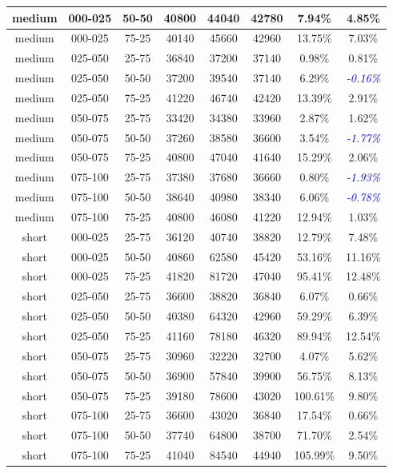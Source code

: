 \begin{table}
\begin{center}
\begin{tabular}{|c|c|c|c|c|c|c|c|}
\\\hline
medium & 000-025 & 50-50 & 40800 & 44040 & 42780 & 7.94\% & 4.85\%
\\\hline
medium & 000-025 & 75-25 & 40140 & 45660 & 42960 & 13.75\% & 7.03\%
\\\hline
medium & 025-050 & 25-75 & 36840 & 37200 & 37140 & 0.98\% & 0.81\%
\\\hline
medium & 025-050 & 50-50 & 37200 & 39540 & 37140 & 6.29\% & \textcolor{blue}{\textit{-0.16\%}}
\\\hline
medium & 025-050 & 75-25 & 41220 & 46740 & 42420 & 13.39\% & 2.91\%
\\\hline
medium & 050-075 & 25-75 & 33420 & 34380 & 33960 & 2.87\% & 1.62\%
\\\hline
medium & 050-075 & 50-50 & 37260 & 38580 & 36600 & 3.54\% & \textcolor{blue}{\textit{-1.77\%}}
\\\hline
medium & 050-075 & 75-25 & 40800 & 47040 & 41640 & 15.29\% & 2.06\%
\\\hline
medium & 075-100 & 25-75 & 37380 & 37680 & 36660 & 0.80\% & \textcolor{blue}{\textit{-1.93\%}}
\\\hline
medium & 075-100 & 50-50 & 38640 & 40980 & 38340 & 6.06\% & \textcolor{blue}{\textit{-0.78\%}}
\\\hline
medium & 075-100 & 75-25 & 40800 & 46080 & 41220 & 12.94\% & 1.03\%
\\\hline
short & 000-025 & 25-75 & 36120 & 40740 & 38820 & 12.79\% & 7.48\%
\\\hline
short & 000-025 & 50-50 & 40860 & 62580 & 45420 & 53.16\% & 11.16\%
\\\hline
short & 000-025 & 75-25 & 41820 & 81720 & 47040 & 95.41\% & 12.48\% 
\\\hline
short & 025-050 & 25-75 & 36600 & 38820 & 36840 & 6.07\% & 0.66\%
\\\hline
short & 025-050 & 50-50 & 40380 & 64320 & 42960 & 59.29\% & 6.39\%
\\\hline
short & 025-050 & 75-25 & 41160 & 78180 & 46320 & 89.94\% & 12.54\%
\\\hline
short & 050-075 & 25-75 & 30960 & 32220 & 32700 & 4.07\% & 5.62\%
\\\hline
short & 050-075 & 50-50 & 36900 & 57840 & 39900 & 56.75\% & 8.13\% 
\\\hline
short & 050-075 & 75-25 & 39180 & 78600 & 43020 & 100.61\% & 9.80\% 
\\\hline
short & 075-100 & 25-75 & 36600 & 43020 & 36840 & 17.54\% & 0.66\%
\\\hline
short & 075-100 & 50-50 & 37740 & 64800 & 38700 & 71.70\% & 2.54\% 
\\\hline
short & 075-100 & 75-25 & 41040 & 84540 & 44940 & 105.99\% & 9.50\% 
\\\hline
\end{tabular}

\label{tab:novmVSfetch}
\end{center}
\end{table}




